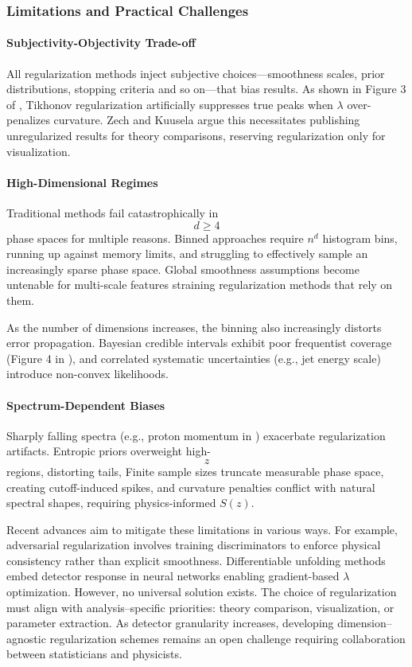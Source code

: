 \subsubsection{Limitations and Practical Challenges}  
\paragraph{Subjectivity-Objectivity Trade-off}  
All regularization methods inject subjective choices---smoothness scales, prior distributions, stopping criteria and so on---that bias results.
%
As shown in Figure 3 of , Tikhonov regularization artificially suppresses true peaks when \(\lambda\) over-penalizes curvature.
%
Zech and Kuusela argue this necessitates publishing unregularized results for theory comparisons, reserving regularization only for visualization.

\paragraph{High-Dimensional Regimes}  
Traditional methods fail catastrophically in $$d \geq 4$$ phase spaces for multiple reasons.
%
Binned approaches require \(n^d\) histogram bins, running up against memory limits, and struggling to effectively sample an increasingly sparse phase space.
%
Global smoothness assumptions become untenable for multi-scale features straining regularization methods that rely on them. 

As the number of dimensions increases, the binning also increasingly distorts error propagation. 
%
Bayesian credible intervals exhibit poor frequentist coverage (Figure 4 in ), and correlated systematic uncertainties (e.g., jet energy scale) introduce non-convex likelihoods.  

\paragraph{Spectrum-Dependent Biases}  
Sharply falling spectra (e.g., proton momentum in ) exacerbate regularization artifacts.
%
Entropic priors overweight high-$$z$$ regions, distorting tails,
%
Finite sample sizes truncate measurable phase space, creating cutoff-induced spikes,
%
and curvature penalties conflict with natural spectral shapes, requiring physics-informed \(S(z)\).  

Recent advances aim to mitigate these limitations in various ways.
For example, adversarial regularization involves training discriminators to enforce physical consistency rather than explicit smoothness.
%
Differentiable unfolding methods embed detector response in neural networks enabling gradient-based \(\lambda\) optimization.
%
However, no universal solution exists. The choice of regularization must align with analysis--specific priorities: theory comparison, visualization, or parameter extraction.
%
As detector granularity increases, developing dimension--agnostic regularization schemes remains an open challenge requiring collaboration between statisticians and physicists.

